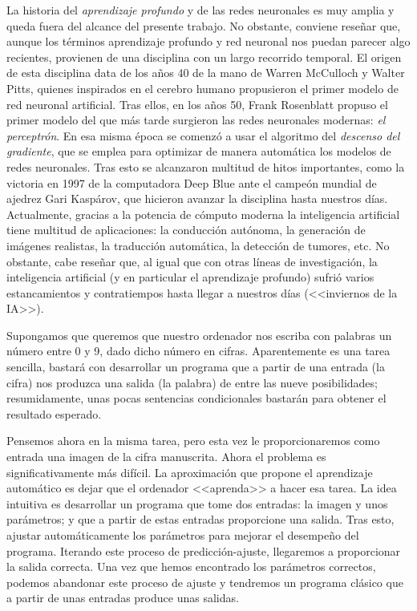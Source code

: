 \documentclass[12pt, a4paper, twoside]{book}
\numberwithin{equation}{section}
\theoremstyle{definition}
\theoremstyle{remark}
\theoremstyle{plain}
\begin{document}
	La historia del \emph{aprendizaje profundo} y de las redes neuronales 
	es muy amplia y queda fuera del alcance del presente trabajo. No 
	obstante, conviene reseñar que, aunque los términos aprendizaje 
	profundo y red neuronal nos puedan parecer algo recientes, provienen 
	de una disciplina con un largo recorrido temporal. El origen de esta 
	disciplina data de los años 40 de la mano de Warren McCulloch y Walter 
	Pitts, quienes inspirados en el cerebro humano propusieron el primer 
	modelo de red neuronal artificial. Tras ellos, en los años 50, Frank 
	Rosenblatt propuso el primer modelo del que más tarde surgieron las
	redes neuronales modernas: \emph{el perceptrón}. En esa misma época se
	comenzó a usar el algoritmo del \emph{descenso del gradiente}, que 
	se emplea para optimizar de manera automática los modelos de redes 
	neuronales. Tras esto se alcanzaron multitud de hitos importantes, 
	como la victoria en 1997 de la computadora Deep Blue ante el campeón 
	mundial de ajedrez Gari Kaspárov, que hicieron avanzar la disciplina 
	hasta nuestros días. Actualmente, gracias a la potencia de cómputo 
	moderna la inteligencia artificial tiene multitud de aplicaciones: la 
	conducción autónoma, la generación de imágenes realistas, la 
	traducción automática, la detección de tumores, etc. No obstante, cabe
	reseñar que, al igual que con otras líneas de investigación, la 
	inteligencia artificial (y en particular el 
	aprendizaje profundo) sufrió varios estancamientos y contratiempos 
	hasta llegar a nuestros días (<<inviernos de la IA>>).

	Supongamos que queremos que nuestro ordenador nos escriba con palabras
	un número entre 0 y 9, dado dicho número en cifras. Aparentemente es 
	una tarea sencilla, bastará con desarrollar un programa que a partir 
	de una entrada (la cifra) nos produzca una salida (la palabra) de 
	entre las nueve posibilidades; resumidamente, unas pocas sentencias 
	condicionales bastarán para obtener el resultado esperado.  

	Pensemos ahora en la 
	misma tarea, pero esta vez le proporcionaremos como entrada una imagen
	de la cifra manuscrita. Ahora el problema es 
	significativamente más difícil. La aproximación que propone el 
	aprendizaje automático es dejar que el ordenador <<aprenda>> a hacer 
	esa tarea. La idea intuitiva es desarrollar un programa que tome dos 
	entradas: la imagen y unos parámetros; y que a partir de estas 
	entradas proporcione una salida. Tras esto, ajustar automáticamente 
	los parámetros para mejorar el desempeño del programa. Iterando este 
	proceso de predicción-ajuste, llegaremos a proporcionar la salida 
	correcta. Una vez que hemos encontrado los parámetros correctos,
	podemos abandonar este proceso de ajuste y tendremos un 
	programa clásico que a partir de unas entradas produce unas salidas.
\end{document}
